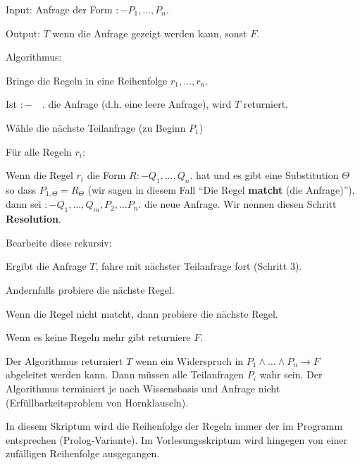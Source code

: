 \begin{algo} \quad
\begin{\whichitem}
\item Input: Anfrage der Form $:- P_1, \ldots, P_n .$
\item Output: $T$ wenn die Anfrage gezeigt werden kann, sonst $F$.
\item Algorithmus:
\begin{\whichenum}
\item Bringe die Regeln in eine Reihenfolge $r_1,\ldots,r_n$.
\item Ist $:- \quad .$ die Anfrage (d.h. eine leere Anfrage), wird $T$ returniert.
\item Wähle die nächste Teilanfrage (zu Beginn $P_1$)
\item Für alle Regeln $r_i$:
\begin{\whichenum}
\item Wenn die Regel $r_i$ die Form $R :- Q_1, \ldots, Q_n .$ hat und es gibt eine Substitution $\Theta$ so dass
$P_{1,\Theta}=R_{\Theta}$ (wir sagen in diesem Fall ``Die Regel \textbf{matcht} (die Anfrage)''),
dann sei $:- Q_1, \ldots, Q_m, P_2, \ldots P_n .$ die neue Anfrage.
Wir nennen diesen Schritt \textbf{Resolution}.

Bearbeite diese rekursiv:
\begin{\whichenum}
\item Ergibt die Anfrage $T$, fahre mit nächster Teilanfrage fort (Schritt 3).
\item Andernfalls probiere die nächste Regel.
\end{\whichenum}
\item Wenn die Regel nicht matcht, dann probiere die nächste Regel.
\item Wenn es keine Regeln mehr gibt returniere $F$.
\end{\whichenum}
\end{\whichenum}
\end{\whichitem}
\end{algo}
Der Algorithmus returniert $T$ wenn ein Widerspruch in $P_1 \wedge \ldots \wedge P_n \to F$ abgeleitet werden kann.
Dann müssen alle Teilanfragen $P_i$ wahr sein. Der Algorithmus terminiert je nach Wissensbasis und Anfrage nicht (Erfüllbarkeitsproblem von Hornklauseln).

In diesem Skriptum wird die Reihenfolge der Regeln immer der im Programm entsprechen (Prolog-Variante).
Im Vorlesungsskriptum wird hingegen von einer zufälligen Reihenfolge ausgegangen.


